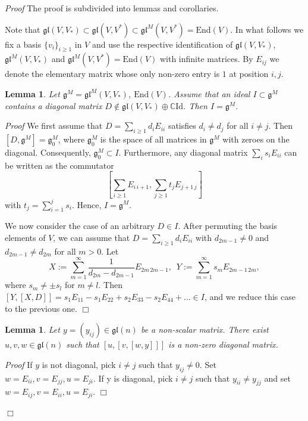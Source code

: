 \documentclass{svmult}
\newtheorem{lem}[theo]{Lemma}
\renewenvironment{proof}{ \emph{Proof}}{$\Box$}
\newcommand {\CC} {\mathbb {C}}
\newcommand{\id}{\mathrm{Id}}
\renewcommand{\gg}{\mathfrak{g}}
\newcommand{\gl}{\mathfrak{gl}}
\newcommand{\End}{\mathrm{End}}
\begin{document}
\begin{proof} The proof is subdivided into lemmas and corollaries. 

Note that $\gl(V,V_*)\subset\gl(V,V^*)\subset \gl^M(V,V^*)=\End(V)$.
In what follows we fix a basis $\{v_i\}_{i\geq 1}$ in $V$ and use the respective identification of $\gl(V,V_*)$, $\gl^M(V,V_*)$ and  
$\gl^M(V,V^*)=\End(V)$
with infinite matrices.
By $E_{ij}$ we denote the elementary matrix whose only non-zero entry is $1$ at position $i,j$.

\begin{lem}\label{lem_diag} Let $\gg^M =\gl^M(V,V_*)$,  $\End(V)$. Assume that an ideal $I \subset \gg^M$ contains a diagonal matrix $D \notin \gl(V,V_*) \oplus \CC \id$. Then $I = \gg^M$.
\end{lem}

\begin{proof}
We first assume that $D=\sum_{i\geq 1} d_i E_{ii}$ satisfies $d_i \neq d_j$ for all $i \neq j$.
Then $[D,\gg^M] = \gg^M_0$, where $\gg^M_0$ is the space of all matrices in $\gg^M$ with zeroes on the diagonal. Consequently, $\gg^M_0 \subset I$. 
Furthermore, any diagonal matrix $\sum_{i} s_i E_{ii}$ can be written as the commutator
\begin{equation}
 \left[\sum_{i \geq 1} E_{i\,i+1}, \sum_{j \geq1} t_j E_{j+1\,j}\right] \nonumber
\end{equation}
with $t_j = \sum_{i=1}^{j} s_i$.
Hence, $I=\gg^M$.

We now consider the case of an arbitrary $D \in I$. After permuting the basis elements of $V$, we can assume that 
$D = \sum_{i\geq 1} d_i E_{ii}$ with $d_{2m-1} \neq 0$ and  $d_{2m-1} \neq d_{2m}$ for all $m > 0$. Let 
\begin{equation}\label{eq:lem_diag}
 X := \sum_{m=1}^{\infty} \frac{1}{d_{2m}-d_{2m-1}}E_{2m\,2m-1}, \,\,\, Y:=\sum_{m=1}^{\infty} s_m E_{2m-1\,2m}, \nonumber
\end{equation}
where $s_m\neq \pm s_l$ for $m \neq l$. Then $[Y,[X,D]]=s_1E_{11} - s_1E_{22} + s_2E_{33} -s_2E_{44} +\dots \in I$, and we reduce this case to the previous one.
\end{proof}

\begin{lem}\label{lem_diag2} 
Let $y = (y_{ij})\in \gl(n)$ be a non-scalar matrix. There exist $u,v,w \in \gl(n)$ such that $[u,[v,[w,y]]]$ is a non-zero diagonal matrix.
\end{lem}
\begin{proof}
 If $y$ is not diagonal, pick $i \neq j$ such that $y_{ij} \neq 0$. Set $w=E_{ii}, v=E_{jj}, u=E_{ji}$. If y is diagonal, pick $i \neq j$ such that $y_{ii} \neq y_{jj}$ and set $w=E_{ij}, v=E_{ii}, u=E_{ji}$.
\end{proof}


\end{proof}
\end{document}
